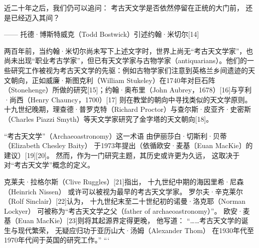 近二十年之后，我们仍可以追问：  
考古天文学是否依然停留在正统的大门前，  
还是已经迈入其间？  

—— 托德·博斯特威克（Todd Bostwick）引述约翰·米切尔[14]

两百年前，当约翰·米切尔尚未写下上述文字时，世界上尚无“考古天文学家”，也尚未出现“职业考古学家”，但已有天文学家与古物学家（antiquarians）。他们的一些研究工作被视为考古天文学的先驱：例如古物学家们注意到英格兰乡间遗迹的天文朝向，正如威廉·斯图克利（William Stukeley）在1740年对巨石阵（Stonehenge）所做的研究[15]；约翰·奥布里（John Aubrey，1678）[16]与亨利·尚西（Henry Chauncy，1700）[17] 则在教堂的朝向中寻找类似的天文学原则。十九世纪晚期，理查德·普罗克特（Richard Proctor）与查尔斯·皮亚齐·史密斯（Charles Piazzi Smyth）等天文学家研究了金字塔的天文朝向[18]。

“考古天文学”（Archaeoastronomy）这一术语  
由伊丽莎白·切斯利·贝蒂（Elizabeth Chesley Baity）  
于1973年提出（依循欧安·麦基〔Euan MacKie〕的建议）[19][20]。  
然而，作为一门研究主题，其历史或许更为久远，  
这取决于对“考古天文学”概念的定义。  

克莱夫·拉格尔斯（Clive Ruggles）[21]指出，  
十九世纪中期的海因里希·尼森（Heinrich Nissen）  
或许可以被视为最早的考古天文学家。  
罗尔夫·辛克莱尔（Rolf Sinclair）[22]认为，  
十九世纪末至二十世纪初的诺曼·洛克耶（Norman Lockyer）  
可被称为“考古天文学之父（father of archaeoastronomy）”。  
欧安·麦基（Euan MacKie）[23]则将其起源界定得更晚，  
他写道：  
“……考古天文学的诞生与现代繁荣，  
无疑应归功于亚历山大·汤姆（Alexander Thom）  
在1930年代至1970年代间于英国的研究工作。”
```
